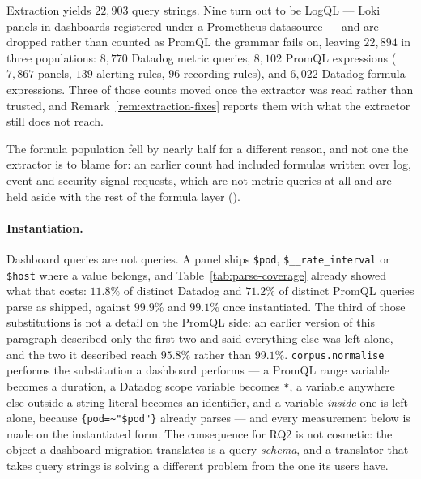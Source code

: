 Extraction yields $22{,}903$ query strings. Nine turn out to be LogQL --- Loki panels
in dashboards registered under a Prometheus datasource --- and are dropped rather than
counted as PromQL the grammar fails on, leaving $22{,}894$ in three populations:
$8{,}770$ Datadog metric queries, $8{,}102$ PromQL expressions ($7{,}867$ panels, $139$
alerting rules, $96$ recording rules), and $6{,}022$ Datadog formula expressions.
Three of those counts moved once the extractor was read rather than trusted, and
Remark~\ref{rem:extraction-fixes} reports them with what the extractor still does not
reach.
\iffull\fi

The formula population fell by nearly half for a different reason, and not one the
extractor is to blame for: an earlier count had included formulas written over log, event
and security-signal requests, which are not metric queries at all and are held aside with
the rest of the formula layer ().

\paragraph{Instantiation.}
Dashboard queries are not queries. A panel ships \texttt{\$pod},
\texttt{\$\_\_rate\_interval} or \texttt{\$host} where a value belongs, and
Table~\ref{tab:parse-coverage} already showed what that costs: $11.8\%$ of distinct
Datadog and $71.2\%$ of distinct PromQL queries parse as shipped, against $99.9\%$ and
$99.1\%$ once instantiated. The third of those substitutions is not a detail on the
PromQL side: an earlier version of this paragraph described only the first two and said
everything else was left alone, and the two it described reach $95.8\%$ rather than
$99.1\%$. \texttt{corpus.normalise} performs the substitution a dashboard performs
--- a PromQL range variable becomes a duration, a Datadog scope variable becomes
\texttt{*}, a variable anywhere else outside a string literal becomes an identifier, and
a variable \emph{inside} one is left alone, because \texttt{\{pod=\~{}"\$pod"\}} already
parses --- and every measurement below is made on the
instantiated form. The consequence for RQ2 is not cosmetic: the object a dashboard
migration translates is a query \emph{schema}, and a translator that takes query strings
is solving a different problem from the one its users have.

\iffull\fi
\iffull\fi
\iffull\fi
\iffull\fi
